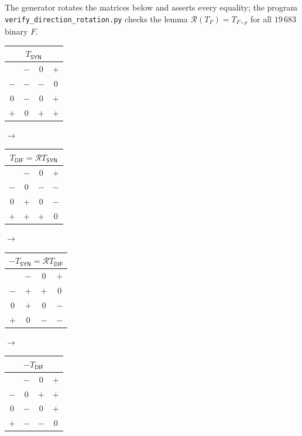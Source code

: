 \documentclass[10pt,a4paper]{article}
\begin{document}
The generator rotates the matrices below and asserts every equality; the program \texttt{verify\_direction\_rotation.py} checks the lemma $\mathcal R(T_F)=T_{F\circ\rho}$ for all $19\,683$ binary $F$.
\begin{center}\small \begin{minipage}[t]{3.1cm}\centering \begin{tabular}{c|ccc}\multicolumn{4}{c}{$T_{\mathsf{SYN}}$}\\\hline &$-$&$0$&$+$\\\hline $-$&$-$&$-$&$0$\\$0$&$-$&$0$&$+$\\$+$&$0$&$+$&$+$\\\end{tabular}\end{minipage}$\to$\begin{minipage}[t]{3.1cm}\centering \begin{tabular}{c|ccc}\multicolumn{4}{c}{$T_{\mathsf{DIF}}=\mathcal R T_{\mathsf{SYN}}$}\\\hline &$-$&$0$&$+$\\\hline $-$&$0$&$-$&$-$\\$0$&$+$&$0$&$-$\\$+$&$+$&$+$&$0$\\\end{tabular}\end{minipage}$\to$\begin{minipage}[t]{3.1cm}\centering \begin{tabular}{c|ccc}\multicolumn{4}{c}{$-T_{\mathsf{SYN}}=\mathcal R T_{\mathsf{DIF}}$}\\\hline &$-$&$0$&$+$\\\hline $-$&$+$&$+$&$0$\\$0$&$+$&$0$&$-$\\$+$&$0$&$-$&$-$\\\end{tabular}\end{minipage}$\to$\begin{minipage}[t]{3.1cm}\centering \begin{tabular}{c|ccc}\multicolumn{4}{c}{$-T_{\mathsf{DIF}}$}\\\hline &$-$&$0$&$+$\\\hline $-$&$0$&$+$&$+$\\$0$&$-$&$0$&$+$\\$+$&$-$&$-$&$0$\\\end{tabular}\end{minipage}\end{center}
\end{document}
